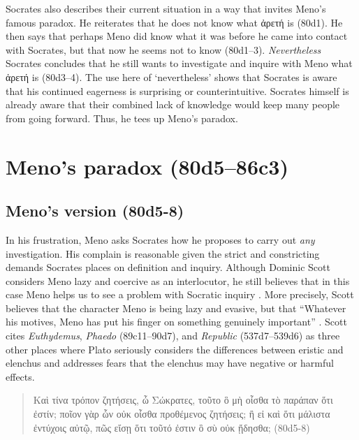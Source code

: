 \documentclass[12pt,letterpaper]{article}
\begin{document}
Socrates also describes their current situation in a way that invites Meno's famous paradox. He reiterates that he does not know what \textgreek{ἀρετή} is (80d1). He then says that perhaps Meno did know what it was before he came into contact with Socrates, but that now he seems not to know (80d1--3). \textit{Nevertheless} Socrates concludes that he still wants to investigate and inquire with Meno what \textgreek{ἀρετή} is (80d3--4). The use here of `nevertheless' shows that Socrates is aware that his continued eagerness is surprising or counterintuitive. Socrates himself is already aware that their combined lack of knowledge would keep many people from going forward. Thus, he tees up Meno's paradox.


\section*{Meno's paradox (80d5--86c3)}

\subsection*{Meno's version (80d5-8)}

In his frustration, Meno asks Socrates how he proposes to carry out \textit{any} investigation. His complain is reasonable given the strict and constricting demands Socrates places on definition and inquiry. Although Dominic Scott considers Meno lazy and coercive as an interlocutor, he still believes that in this case Meno helps us to see a problem with Socratic inquiry \parencite[69--74]{scott2006}. More precisely, Scott believes that the character Meno is being lazy and evasive, but that ``Whatever his motives, Meno has put his finger on something genuinely important'' \parencite[71--72]{scott2006}. Scott cites \textit{Euthydemus}, \textit{Phaedo} (89c11--90d7), and \textit{Republic} (537d7--539d6) as three other places where Plato seriously considers the differences between eristic and elenchus and addresses fears that the elenchus may have negative or harmful effects.

\begin{quote}
\begin{greek}Καὶ τίνα τρόπον ζητήσεις, ὦ Σώκρατες, τοῦτο ὃ μὴ οἶσθα τὸ παράπαν ὅτι ἐστίν; ποῖον γὰρ ὧν οὐκ οἶσθα προθέμενος ζητήσεις; ἢ εἰ καὶ ὅτι μάλιστα ἐντύχοις αὐτῷ, πῶς εἴσῃ ὅτι τοῦτό ἐστιν ὃ σὺ οὐκ ᾔδησθα; \textenglish{(80d5-8)}\end{greek}
\end{quote}
\end{document}
